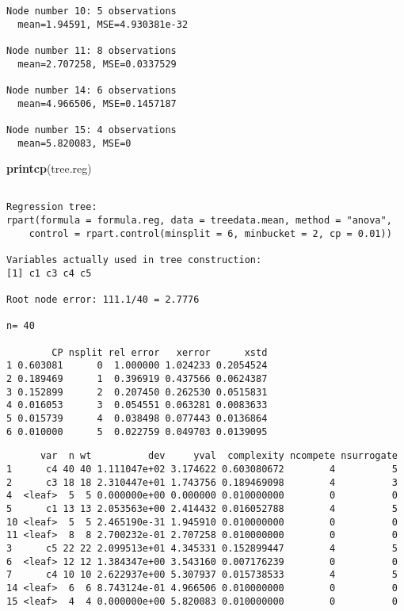 \documentclass[]{article}
\newenvironment{Shaded}{\begin{snugshade}}{\end{snugshade}}
\newcommand{\KeywordTok}[1]{\textcolor[rgb]{0.13,0.29,0.53}{\textbf{{#1}}}}
\newcommand{\NormalTok}[1]{{#1}}
\begin{document}
\begin{verbatim}
Node number 10: 5 observations
  mean=1.94591, MSE=4.930381e-32 

Node number 11: 8 observations
  mean=2.707258, MSE=0.0337529 

Node number 14: 6 observations
  mean=4.966506, MSE=0.1457187 

Node number 15: 4 observations
  mean=5.820083, MSE=0 
\end{verbatim}

\begin{Shaded}
\begin{Highlighting}[]
\KeywordTok{printcp}\NormalTok{(tree.reg)}
\end{Highlighting}
\end{Shaded}

\begin{verbatim}

Regression tree:
rpart(formula = formula.reg, data = treedata.mean, method = "anova", 
    control = rpart.control(minsplit = 6, minbucket = 2, cp = 0.01))

Variables actually used in tree construction:
[1] c1 c3 c4 c5

Root node error: 111.1/40 = 2.7776

n= 40 

        CP nsplit rel error   xerror      xstd
1 0.603081      0  1.000000 1.024233 0.2054524
2 0.189469      1  0.396919 0.437566 0.0624387
3 0.152899      2  0.207450 0.262530 0.0515831
4 0.016053      3  0.054551 0.063281 0.0083633
5 0.015739      4  0.038498 0.077443 0.0136864
6 0.010000      5  0.022759 0.049703 0.0139095
\end{verbatim}

\begin{Shaded}
\end{Shaded}

\begin{verbatim}
      var  n wt          dev     yval  complexity ncompete nsurrogate
1      c4 40 40 1.111047e+02 3.174622 0.603080672        4          5
2      c3 18 18 2.310447e+01 1.743756 0.189469098        4          3
4  <leaf>  5  5 0.000000e+00 0.000000 0.010000000        0          0
5      c1 13 13 2.053563e+00 2.414432 0.016052788        4          5
10 <leaf>  5  5 2.465190e-31 1.945910 0.010000000        0          0
11 <leaf>  8  8 2.700232e-01 2.707258 0.010000000        0          0
3      c5 22 22 2.099513e+01 4.345331 0.152899447        4          5
6  <leaf> 12 12 1.384347e+00 3.543160 0.007176239        0          0
7      c4 10 10 2.622937e+00 5.307937 0.015738533        4          5
14 <leaf>  6  6 8.743124e-01 4.966506 0.010000000        0          0
15 <leaf>  4  4 0.000000e+00 5.820083 0.010000000        0          0
\end{verbatim}
\end{document}
